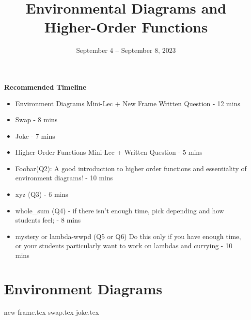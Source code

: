 \documentclass{exam}
\title{Environmental Diagrams \titlebreak and Higher-Order Functions}
\date{September 4 -- September 8, 2023}
\begin{document}
\maketitle

\begin{blocksection}
\begin{guide}
\textbf{Recommended Timeline}


\begin{itemize}
    \item Environment Diagrams Mini-Lec + New Frame Written Question - 12 mins
    \item Swap - 8 mins
    \item Joke - 7 mins
    \item Higher Order Functions Mini-Lec + Written Question - 5 mins
    \item Foobar(Q2): A good introduction to higher order functions and essentiality of environment diagrams! - 10 mins
    \item xyz (Q3) - 6 mins
    \item whole\_sum (Q4) - if there isn't enough time, pick depending and how students feel; - 8 mins
    \item mystery or lambda-wwpd (Q5 or Q6) Do this only if you have enough time, or your students particularly want to work on lambdas and currying - 10 mins
\end{itemize}
\end{guide}
\end{blocksection}


\section{Environment Diagrams}

\begin{questions}
{new-frame.tex}
{swap.tex}
{joke.tex}
\end{questions}
\end{document}
